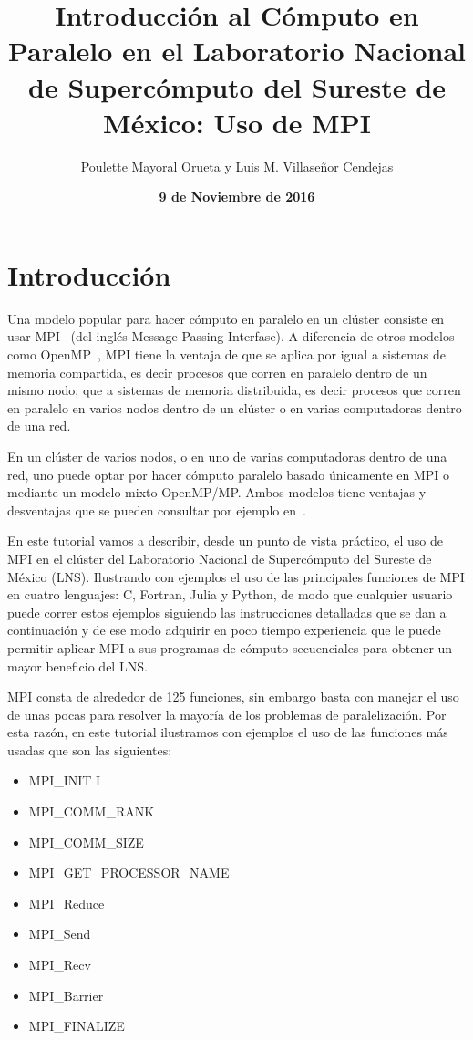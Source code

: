 \documentclass[letter]{jpconf}
\begin{document}
 \vspace*{-45mm}
\title{Introducci\'on al C\'omputo en Paralelo en el Laboratorio Nacional de Superc\'omputo del Sureste de M\'exico: Uso de MPI }
\author{Poulette Mayoral Orueta y Luis M. Villase\~nor Cendejas}

\address{Benem\'erita Universidad Aut\'onoma de Puebla, Puebla, Mexico}

\author{\textbf{9 de Noviembre de 2016}}
\section{Introducci\'on}

Una modelo popular  para hacer c\'omputo en paralelo en un cl\'uster consiste en usar MPI~\cite{mpi} (del ingl\'es Message Passing Interfase). A diferencia de otros modelos como OpenMP~\cite{openmp}, MPI tiene la ventaja de que se aplica por igual a sistemas de memoria compartida, es decir procesos que corren en paralelo dentro de un mismo nodo, que a sistemas de memoria distribuida, es decir procesos que corren en paralelo en varios nodos dentro de un cl\'uster o en varias computadoras dentro de una red. 

En un cl\'uster de varios nodos, o en uno de varias computadoras dentro de una red, uno puede optar por hacer c\'omputo paralelo basado \'unicamente en MPI o mediante un modelo mixto OpenMP/MP. Ambos modelos tiene  ventajas y desventajas que se pueden consultar por ejemplo en~\cite{openmpvsmpi}. 

En este tutorial vamos a describir, desde un punto de vista pr\'actico, el uso de MPI en el cl\'uster del Laboratorio Nacional de Superc\'omputo del Sureste de M\'exico (LNS). Ilustrando con ejemplos el uso de las principales funciones de MPI en cuatro lenguajes: C, Fortran, Julia y Python, de modo que cualquier usuario puede correr estos ejemplos siguiendo las instrucciones detalladas que se dan a continuaci\'on y de ese modo adquirir en poco tiempo experiencia que le puede permitir aplicar MPI a sus programas de c\'omputo secuenciales  para obtener un mayor beneficio del LNS.

MPI consta de alrededor de 125 funciones, sin embargo basta con manejar el uso de unas pocas para resolver la mayor\'ia de los problemas de paralelizaci\'on. Por esta raz\'on, en este tutorial   ilustramos con ejemplos el uso de las funciones m\'as usadas que son las siguientes:
\begin{itemize} 
\item MPI\_INIT I
\item MPI\_COMM\_RANK  
\item MPI\_COMM\_SIZE 
\item MPI\_GET\_PROCESSOR\_NAME
\item MPI\_Reduce 
\item MPI\_Send 
\item MPI\_Recv 
\item MPI\_Barrier
\item MPI\_FINALIZE 
\end{itemize} 
\end{document}
